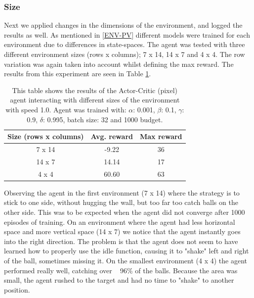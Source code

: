 \documentclass{article}
\begin{document}
\subsubsection{Size}
Next we applied changes in the dimensions of the environment, and logged the results as well.
As mentioned in \ref{ENV-PV} different models were trained for each environment due to differences in state-spaces. 
The agent was tested with three different environment sizes (rows x columns); 7 x 14, 14 x 7 and 4 x 4. 
The row variation was again taken into account whilst defining the max reward. 
The results from this experiment are seen in Table \ref{tab:Pixel-size}.

\begin{table}[htbp]
    \centering
    \begin{tabular}{|c|c|c|}
        \hline
        \textbf{Size (rows x columns)} & \textbf{Avg. reward} & \textbf{Max reward} \\
        \hline
        7 x 14                & -9.22       & 36                  \\
        14 x 7                & 14.14       & 17                  \\
        4 x 4                 & 60.60       & 63                    \\
        \hline
    \end{tabular}
    \caption{This table shows the results of the Actor-Critic (pixel) agent interacting with different sizes of the environment with speed 1.0. 
    Agent was trained with: $\alpha$: 0.001, $\beta$: 0.1, $\gamma$: 0.9, $\delta$: 0.995, batch size: 32 and 1000 budget. }
    \label{tab:Pixel-size}
\end{table}

Observing the agent in the first environment (7 x 14)  where the strategy is to stick to one side, without hugging the wall, but too far too catch balls on the other side. 
This was to be expected when the agent did not converge after 1000 episodes of training. 
On an environment where the agent had less horizontal space and more vertical space (14 x 7) we notice that the agent instantly goes into the right direction.
The problem is that the agent does not seem to have learned how to properly use the idle function, causing it to "shake" left and right of the ball, sometimes missing it. 
On the smallest environment (4 x 4) the agent performed really well, catching over ~ 96\% of the balls.
Because the area was small, the agent rushed to the target and had no time to "shake" to another position.
\end{document}
